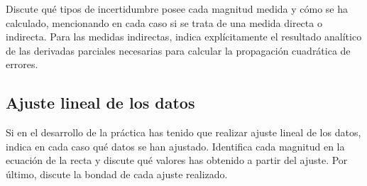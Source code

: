 Discute qué tipos de incertidumbre posee cada magnitud medida y cómo se ha calculado, mencionando en cada caso si se trata de una medida directa o indirecta. Para las medidas indirectas, indica explícitamente el resultado analítico de las derivadas parciales necesarias para calcular la propagación cuadrática de errores.

\subsection{Ajuste lineal de los datos}

Si en el desarrollo de la práctica has tenido que realizar ajuste lineal de los datos, indica en cada caso qué datos se han ajustado. Identifica cada magnitud en la ecuación de la recta y discute qué valores has obtenido a partir del ajuste. Por último, discute la bondad de cada ajuste realizado.

\printbibliography